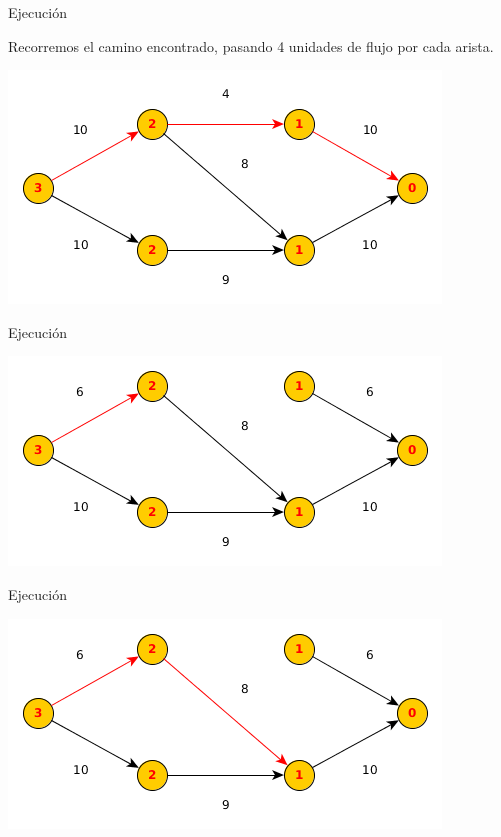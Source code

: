 \documentclass{beamer}
\begin{document}
\begin{frame}{Ejecución}

    Recorremos el camino encontrado, pasando 4 unidades de flujo por cada arista.
    
    \includegraphics[scale=0.6]{dinitz/dinitz6.png}
    
\end{frame}

\begin{frame}{Ejecución}

    
    \includegraphics[scale=0.6]{dinitz/dinitz7.png}
    
\end{frame}

\begin{frame}{Ejecución}

    
    \includegraphics[scale=0.6]{dinitz/dinitz8.png}
    
\end{frame}
\end{document}
